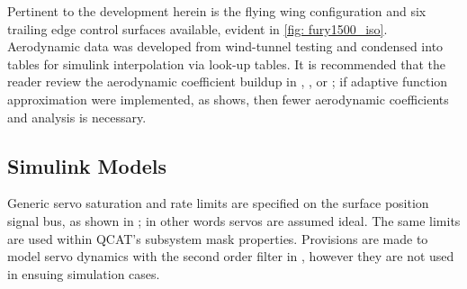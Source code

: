\documentclass[12pt]{ucthesis}
\begin{document}
Pertinent to the development herein is the flying wing configuration and six trailing edge control surfaces available, evident in \autoref{fig: fury1500_iso}. Aerodynamic data was developed from wind-tunnel testing and condensed into tables for simulink interpolation via look-up tables. It is recommended that the reader review the aerodynamic coefficient buildup in \citet[Appendix A.]{Duke1988}, \citet[Sec. 2.3]{Stevens2003}, or \citet[Chp. 3]{Morelli06}; if adaptive function approximation were implemented, as \citet[VII. Approximator Definition]{Farrell2005} shows, then fewer aerodynamic coefficients and analysis is necessary.

\subsection{Simulink Models}
\label{subsec: simulink_models}
%
Generic servo saturation and rate limits are specified on the surface position signal bus, as shown in ; in other words servos are assumed ideal. The same limits are used within QCAT's subsystem mask properties. Provisions are made to model servo dynamics with the second order filter in , however they are not used in ensuing simulation cases.
\end{document}
